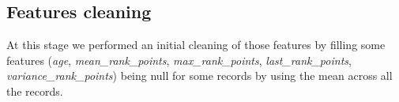 \documentclass{article}
\begin{document}
\subsection{Features cleaning}
At this stage we performed an initial cleaning of those features by filling some features (\textit{age},  \textit{mean\_rank\_points},  \textit{max\_rank\_points},  \textit{last\_rank\_points},  \textit{variance\_rank\_points}) being null for some records by using the mean across all the records.

\newpage
   

\newpage

\end{document}
